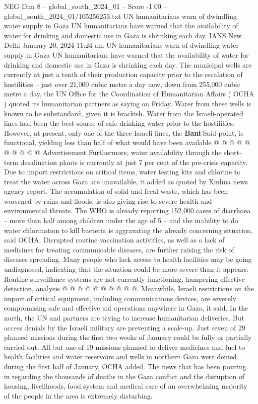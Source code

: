 \begin{textsample}{NEG Dim 8 – global\_south\_2024\_01 – Score -1.00 – global\_south\_2024\_01/105256253.txt}  \label{ex:f8_neg_172}
UN humanitarians warn of dwindling water supply in Gaza UN humanitarians have warned that the availability of water for drinking and domestic use in Gaza is shrinking each day.
IANS New Delhi January 20, 2024 11:24 am UN humanitarians warn of dwindling water supply in Gaza UN humanitarians have warned that the availability of water for drinking and domestic use in Gaza is shrinking each day.
The municipal wells are currently at just a tenth of their production capacity prior to the escalation of hostilities -- just over 21,000 cubic metre a day now, down from 255,000 cubic metre a day, the UN Office for the Coordination of Humanitarian Affairs ( OCHA ) quoted its humanitarian partners as saying on Friday.
Water from these wells is known to be substandard, given it is brackish.
Water from the Israeli-operated lines had been the best source of safe drinking water prior to the hostilities.
However, at present, only one of the three Israeli lines, the \textbf{Bani} Said point, is functional, yielding less than half of what would have been available @ @ @ @ @ @ @ @ @ @ Advertisement Furthermore, water availability through the short-term desalination plants is currently at just 7 per cent of the pre-crisis capacity.
Due to import restrictions on critical items, water testing kits and chlorine to treat the water across Gaza are unavailable, it added as quoted by Xinhua news agency report.
The accumulation of solid and fecal waste, which has been worsened by rains and floods, is also giving rise to severe health and environmental threats.
The WHO is already reporting 152,000 cases of diarrhoea -- more than half among children under the age of 5 -- and the inability to do water chlorination to kill bacteria is aggravating the already concerning situation, said OCHA.
Disrupted routine vaccination activities, as well as a lack of medicines for treating communicable diseases, are further raising the risk of diseases spreading.
Many people who lack access to health facilities may be going undiagnosed, indicating that the situation could be more severe than it appears.
Routine surveillance systems are not currently functioning, hampering effective detection, analysis @ @ @ @ @ @ @ @ @ @.
Meanwhile, Israeli restrictions on the import of critical equipment, including communications devices, are severely compromising safe and effective aid operations anywhere in Gaza, it said.
In the north, the UN and partners are trying to increase humanitarian deliveries.
But access denials by the Israeli military are preventing a scale-up.
Just seven of 29 planned missions during the first two weeks of January could be fully or partially carried out.
All but one of 19 missions planned to deliver medicines and fuel to health facilities and water reservoirs and wells in northern Gaza were denied during the first half of January, OCHA added.
The news that has been pouring in regarding the thousands of deaths in the Gaza conflict and the disruption of housing, livelihoods, food system and medical care of an overwhelming majority of the people in the area is extremely disturbing.

\end{textsample}
